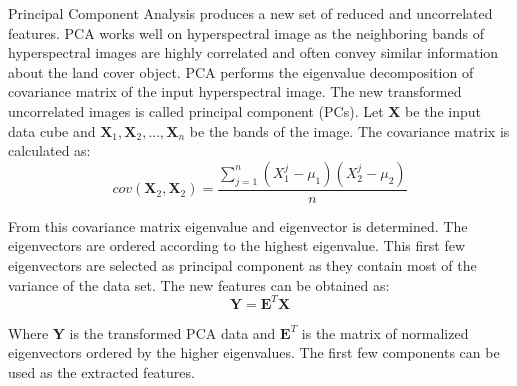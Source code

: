 \documentclass[document.tex]{subfiles}
\begin{document}
Principal Component Analysis produces a new set of reduced and uncorrelated features. PCA works well on hyperspectral image as the neighboring bands of hyperspectral images are highly correlated and often convey similar information about the land cover object. PCA performs  the eigenvalue decomposition of covariance matrix of the input hyperspectral image. The new transformed uncorrelated images is called principal component (PCs). Let \textbf{X} be the input data cube and $\textbf{X}_1,\textbf{X}_2,...,\textbf{X}_n$ be the bands of the image. The covariance matrix is calculated as: 
\begin{equation}
cov(\textbf{X}_2,\textbf{X}_2) = \dfrac{\sum_{j=1}^{n}(X_1^j-\mu_1)(X_2^j-\mu_2)}{n}
\end{equation}

\noindent From this covariance matrix eigenvalue and eigenvector is determined. The eigenvectors are ordered according to the highest eigenvalue. This first few eigenvectors are selected as principal component as they contain most of the variance of the data set. The new features can be obtained as:
\begin{equation}
\textbf{Y} = \textbf{E}^T\textbf{X}
\end{equation}

\noindent Where \textbf{Y} is the transformed PCA data and $\textbf{E}^T$ is the matrix of normalized eigenvectors ordered by the higher eigenvalues. The first few components can be used as the extracted features.

 
\end{document}
